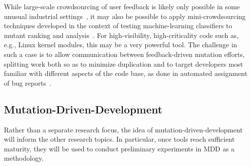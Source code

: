 While large-scale crowdsourcing of user feedback is likely only
possible in some unusual industrial
settings~\cite{MutGoogle,ivankovic2018industrial}, it may also be
possible to apply mini-crowdsourcing techniques developed in the
context of testing machine-learning classifiers to mutant ranking and
analysis~\cite{Minicrowd}.  For high-visibility, high-criticality code
such as, e.g., Linux kernel modules, this may be a very powerful
tool.  The challenge in such a case is to allow communication between
feedback-driven mutation efforts, splitting work both so as to
minimize duplication and to target developers most familiar with
different aspects of the code base, as done in automated assignment of
bug reports~\cite{bhattacharya2012automated,jonsson2016automated}.


\subsection{Mutation-Driven-Development}

Rather than a separate research focus, the idea of
mutation-driven-development will inform the other
research topics.  In particular, once tools
reach sufficient maturity, they will be used to conduct preliminary
experiments in MDD as a methodology.  %

